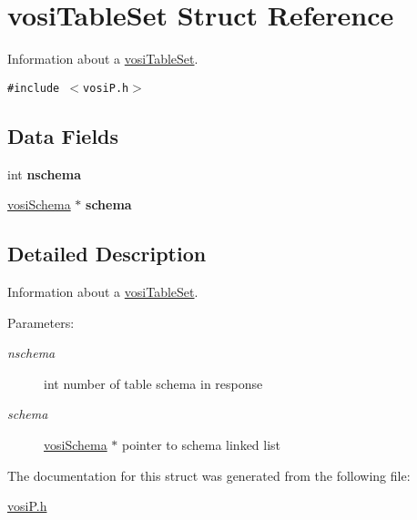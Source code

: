 \hypertarget{structvosiTableSet}{
\section{vosiTableSet Struct Reference}
\label{structvosiTableSet}
}
Information about a \hyperlink{structvosiTableSet}{vosiTableSet}.  


{\tt \#include $<$vosiP.h$>$}

\subsection*{Data Fields}
\begin{CompactItemize}
\item 
\hypertarget{structvosiTableSet_4012e00d53674f5af0f2f046c8619674}{
int \textbf{nschema}}
\label{structvosiTableSet_4012e00d53674f5af0f2f046c8619674}

\item 
\hypertarget{structvosiTableSet_5ce304a3b24d1bb61f07da9a769f24c3}{
\hyperlink{structvosiSchema}{vosiSchema} $\ast$ \textbf{schema}}
\label{structvosiTableSet_5ce304a3b24d1bb61f07da9a769f24c3}

\end{CompactItemize}


\subsection{Detailed Description}
Information about a \hyperlink{structvosiTableSet}{vosiTableSet}. 

\begin{Desc}
\item[Parameters:]
\begin{description}
\item[{\em nschema}]int number of table schema in response \item[{\em schema}]\hyperlink{structvosiSchema}{vosiSchema} $\ast$ pointer to schema linked list \end{description}
\end{Desc}


The documentation for this struct was generated from the following file:\begin{CompactItemize}
\item 
\hyperlink{vosiP_8h}{vosiP.h}\end{CompactItemize}
